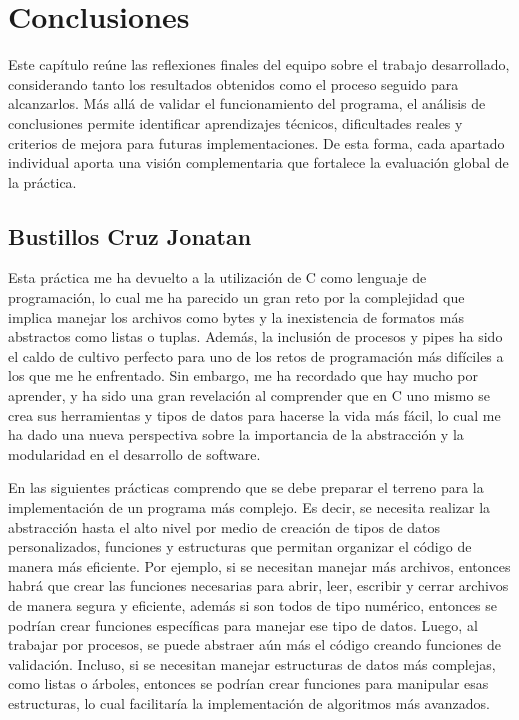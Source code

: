 
\chapter{Conclusiones}

Este capítulo reúne las reflexiones finales del equipo sobre el trabajo desarrollado, considerando tanto los resultados obtenidos como el proceso seguido para alcanzarlos. Más allá de validar el funcionamiento del programa, el análisis de conclusiones permite identificar aprendizajes técnicos, dificultades reales y criterios de mejora para futuras implementaciones. De esta forma, cada apartado individual aporta una visión complementaria que fortalece la evaluación global de la práctica.

\newpage
\section{Bustillos Cruz Jonatan}


Esta práctica me ha devuelto a la utilización de C como lenguaje de programación, lo cual me ha parecido un gran reto por la complejidad que implica manejar los archivos como bytes y la inexistencia de formatos más abstractos como listas o tuplas. Además, la inclusión de procesos y pipes ha sido el caldo de cultivo perfecto para uno de los retos de programación más difíciles a los que me he enfrentado. Sin embargo, me ha recordado que hay mucho por aprender, y ha sido una gran revelación al comprender que en C uno mismo se crea sus herramientas y tipos de datos para hacerse la vida más fácil, lo cual me ha dado una nueva perspectiva sobre la importancia de la abstracción y la modularidad en el desarrollo de software.

En las siguientes prácticas comprendo que se debe preparar el terreno para la implementación de un programa más complejo. Es decir, se necesita realizar la abstracción hasta el alto nivel por medio de creación de tipos de datos personalizados, funciones y estructuras que permitan organizar el código de manera más eficiente. Por ejemplo, si se necesitan manejar más archivos, entonces habrá que crear las funciones necesarias para abrir, leer, escribir y cerrar archivos de manera segura y eficiente, además si son todos de tipo numérico, entonces se podrían crear funciones específicas para manejar ese tipo de datos. Luego, al trabajar por procesos, se puede abstraer aún más el código creando funciones de validación. Incluso, si se necesitan manejar estructuras de datos más complejas, como listas o árboles, entonces se podrían crear funciones para manipular esas estructuras, lo cual facilitaría la implementación de algoritmos más avanzados.

